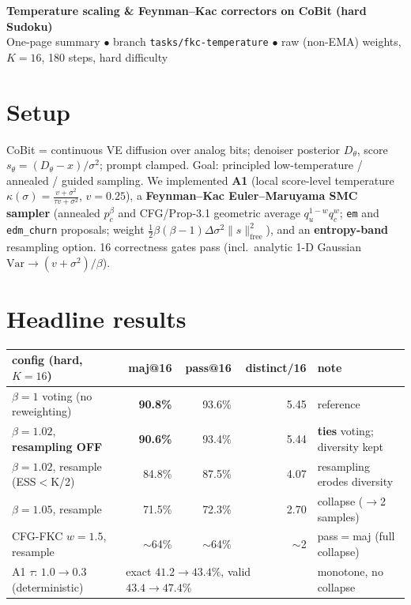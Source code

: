 \documentclass[10pt]{article}
\newcommand{\hl}[1]{\textcolor{blue!60!black}{\textbf{#1}}}
\begin{document}
\begin{center}
{\Large\bfseries Temperature scaling \& Feynman--Kac correctors on CoBit (hard Sudoku)}\\[2pt]
{\small One-page summary $\bullet$ branch \texttt{tasks/fkc-temperature} $\bullet$ raw (non-EMA) weights, $K{=}16$, 180 steps, hard difficulty}
\end{center}
\vspace{-4pt}

\section*{Setup}
CoBit = continuous VE diffusion over analog bits; denoiser posterior $D_\theta$, score $s_\theta=(D_\theta-x)/\sigma^2$; prompt clamped. Goal: principled low-temperature / annealed / guided sampling. We implemented \hl{A1} (local score-level temperature $\kappa(\sigma)=\tfrac{v+\sigma^2}{\tau v+\sigma^2}$, $v{=}0.25$), a \hl{Feynman--Kac Euler--Maruyama SMC sampler} (annealed $p_c^\beta$ and CFG/Prop-3.1 geometric average $q_u^{1-w}q_c^w$; \texttt{em} and \texttt{edm\_churn} proposals; weight $\tfrac12\beta(\beta{-}1)\Delta\sigma^2\lVert s\rVert^2_{\text{free}}$), and an \hl{entropy-band} resampling option. 16 correctness gates pass (incl.\ analytic 1-D Gaussian $\mathrm{Var}\!\to\!(v+\sigma^2)/\beta$).

\section*{Headline results}
\begin{center}\small
\begin{tabular}{@{}l r r r l@{}}
\toprule
config (hard, $K{=}16$) & maj@16 & pass@16 & distinct/16 & note\\
\midrule
$\beta{=}1$ voting (no reweighting) & \hl{90.8\%} & 93.6\% & 5.45 & reference \\
$\beta{=}1.02$, \textbf{resampling OFF} & \hl{90.6\%} & 93.4\% & 5.44 & \textbf{ties} voting; diversity kept \\
$\beta{=}1.02$, resample (ESS$<$K/2) & 84.8\% & 87.5\% & 4.07 & resampling erodes diversity \\
$\beta{=}1.05$, resample & 71.5\% & 72.3\% & 2.70 & collapse ($\to$2 samples) \\
CFG-FKC $w{=}1.5$, resample & $\sim$64\% & $\sim$64\% & $\sim$2 & pass$=$maj (full collapse) \\
A1 $\tau$: $1.0\!\to\!0.3$ (deterministic) & \multicolumn{3}{l}{exact $41.2\!\to\!43.4\%$, valid $43.4\!\to\!47.4\%$} & monotone, no collapse \\
\bottomrule
\end{tabular}
\end{center}
\end{document}
